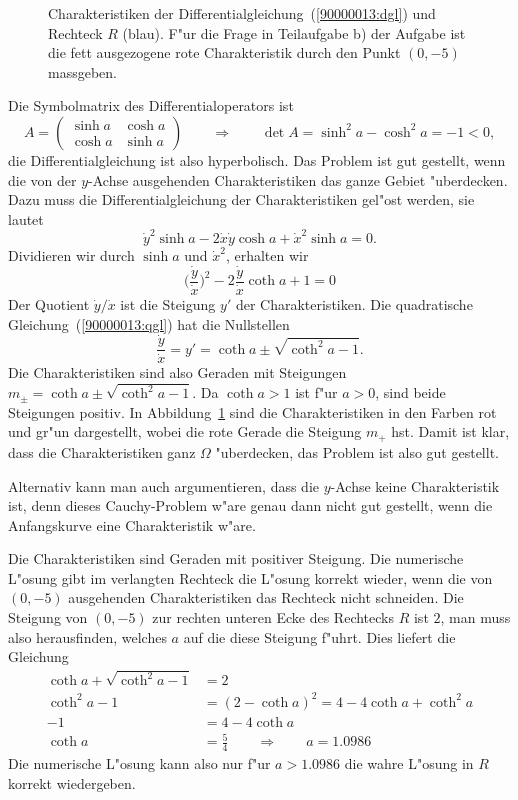 \begin{loesung}
\begin{figure}
\centering
{}
\caption{Charakteristiken der Differentialgleichung~(\ref{90000013:dgl})
und Rechteck $R$ (blau). 
F"ur die Frage in Teilaufgabe b) der Aufgabe ist die fett ausgezogene
rote Charakteristik durch den Punkt $(0,-5)$ massgeben.
\label{90000013:domain}}
\end{figure}
\begin{teilaufgaben}
\item
Die Symbolmatrix des Differentialoperators ist
\[
A=\begin{pmatrix}\sinh a&\cosh a \\ \cosh a&\sinh a\end{pmatrix}
\qquad\Rightarrow\qquad
\det A=\sinh^2 a - \cosh^2 a = -1<0,
\]
die Differentialgleichung ist also hyperbolisch.
Das Problem ist gut gestellt, wenn die von der $y$-Achse ausgehenden
Charakteristiken das ganze Gebiet "uberdecken. 
Dazu muss die Differentialgleichung der Charakteristiken gel"ost werden,
sie lautet
\[
\dot y^2
\sinh a
-2
\dot x\dot y
\cosh a
+
\dot x^2
\sinh a
=0.
\]
Dividieren wir durch $\sinh a $ und $\dot x^2$, erhalten wir
\begin{equation}
\biggl(\frac{\dot y}{\dot x}\biggr)^2
-2\frac{\dot y}{\dot x} \coth a + 1=0
\label{90000013:qgl}
\end{equation}
Der Quotient $\dot y/\dot x$ ist die Steigung $y'$ der Charakteristiken.
Die quadratische Gleichung~(\ref{90000013:qgl}) hat die Nullstellen
\[
\frac{\dot y}{\dot x}=y'=
\coth a\pm\sqrt{\coth^2 a-1}
.
\]
Die Charakteristiken sind also Geraden mit Steigungen
$m_{\pm}=\coth a\pm\sqrt{\coth^2a-1}$.
Da $\coth a>1$ ist f"ur $a>0$, sind beide Steigungen positiv.
In Abbildung~\ref{90000013:domain} sind die Charakteristiken in den Farben
rot und gr"un dargestellt, wobei die rote Gerade die Steigung $m_+$ hst.
Damit ist klar, dass die Charakteristiken ganz $\Omega$ "uberdecken, das
Problem ist also gut gestellt.

Alternativ kann man auch argumentieren, dass die $y$-Achse keine 
Charakteristik ist, denn dieses Cauchy-Problem w"are genau dann
nicht gut gestellt, wenn die Anfangskurve eine Charakteristik w"are.
\item
Die Charakteristiken sind Geraden mit positiver Steigung.
Die numerische L"osung gibt im verlangten Rechteck die L"osung
korrekt wieder, wenn die von $(0,-5)$ ausgehenden Charakteristiken
das Rechteck nicht schneiden.
Die Steigung von $(0,-5)$ zur rechten unteren Ecke des Rechtecks $R$
ist $2$, 
man muss also herausfinden, welches $a$ auf die diese Steigung f"uhrt.
Dies liefert die Gleichung
\begin{align*}
\coth a + \sqrt{\coth^2 a-1}&=2
\\
\coth^2 a-1&=(2-\coth a)^2=4-4\coth a +\coth^2 a
\\
-1 &=4-4\coth a
\\
\coth a&=\frac54
\qquad\Rightarrow\qquad
a=1.0986
\end{align*}
Die numerische L"osung kann also nur f"ur $a>1.0986$ die wahre L"osung in
$R$ korrekt wiedergeben.
\qedhere
\end{teilaufgaben}
\end{loesung}

